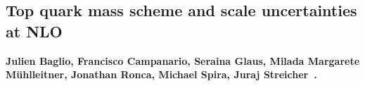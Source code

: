 \subsection{Top quark mass scheme and scale uncertainties at NLO}
\label{sec:NLO-uncertainties}


\textbf{Julien Baglio, Francisco Campanario, Seraina Glaus, Milada Margarete Mühl\-leitner, Jonathan Ronca, Michael Spira, Juraj Streicher~\cite{Baglio:2018lrj,Baglio:2020ini,Baglio:2020wgt}.}


